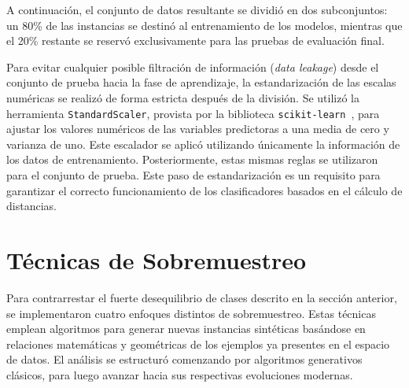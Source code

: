 \documentclass[a4paper,11pt ,openany]{book}
\begin{document}
A continuación, el conjunto de datos resultante se dividió en dos subconjuntos: un 80\% de las instancias se destinó al entrenamiento de los modelos, mientras que el 20\% restante se reservó exclusivamente para las pruebas de evaluación final. 

Para evitar cualquier posible filtración de información (\textit{data leakage}) desde el conjunto de prueba hacia la fase de aprendizaje, la estandarización de las escalas numéricas se realizó de forma estricta después de la división. Se utilizó la herramienta \texttt{StandardScaler}, provista por la biblioteca \texttt{scikit-learn}~\cite{pedregosa2011scikit}, para ajustar los valores numéricos de las variables predictoras a una media de cero y varianza de uno. Este escalador se aplicó utilizando únicamente la información de los datos de entrenamiento. Posteriormente, estas mismas reglas se utilizaron para el conjunto de prueba. Este paso de estandarización es un requisito para garantizar el correcto funcionamiento de los clasificadores basados en el cálculo de distancias.

\section{Técnicas de Sobremuestreo}
Para contrarrestar el fuerte desequilibrio de clases descrito en la sección anterior, se implementaron cuatro enfoques distintos de sobremuestreo. Estas técnicas emplean algoritmos para generar nuevas instancias sintéticas basándose en relaciones matemáticas y geométricas de los ejemplos ya presentes en el espacio de datos. El análisis se estructuró comenzando por algoritmos generativos clásicos, para luego avanzar hacia sus respectivas evoluciones modernas.
\end{document}
